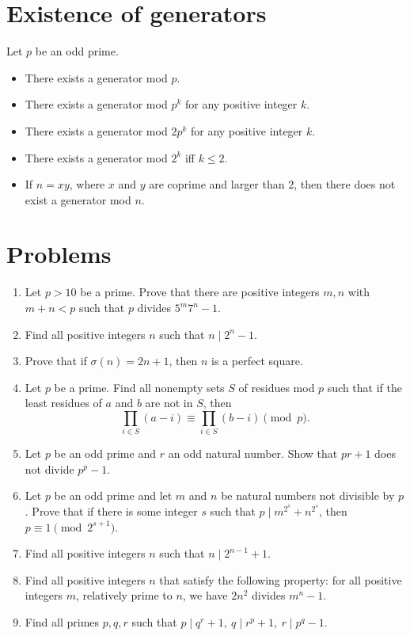 \documentclass{article}
\begin{document}
\section{Existence of generators}
Let $p$ be an odd prime.
\begin{itemize}
	\item There exists a generator mod $p$.
	\item There exists a generator mod $p^k$ for any positive integer $k$.
	\item There exists a generator mod $2p^k$ for any positive integer $k$.
	\item There exists a generator mod $2^k$ iff $k\le 2$.
	\item If $n=xy$, where $x$ and $y$ are coprime and larger than $2$, then there
	      does not exist a generator mod $n$.
\end{itemize}
\section{Problems}
\begin{enumerate}
	\item Let $p>10$ be a prime. Prove that there are positive integers $m,n$ with
	      $m+n<p$ such that $p$ divides $5^m7^n-1$.
	\item Find all positive integers $n$ such that $n\mid 2^n-1$.
	\item Prove that if $\sigma(n)=2n+1$, then $n$ is a perfect square.
	\item Let $p$ be a prime. Find all nonempty sets $S$ of residues mod $p$ such
	      that if the least residues of $a$ and $b$ are not in $S$, then \[\prod_{i\in S}(a-i)\equiv\prod_{i\in S}(b-i)\pmod
		      p.\]
	\item Let $p$ be an odd prime and $r$ an odd natural number. Show that $pr+1$
	      does not divide $p^p-1$.
	\item Let $p$ be an odd prime and let $m$ and $n$ be natural numbers not
	      divisible by $p$. Prove that if there is some integer $s$ such that $p\mid
		      m^{2^s}+n^{2^s}$, then $p\equiv 1\pmod{2^{s+1}}$.
	\item Find all positive integers $n$ such that $n\mid 2^{n-1}+1$.
	\item Find all positive integers $n$ that satisfy the following property:
	      for all positive integers $m$, relatively prime to $n$, we have
	      $2n^2$ divides $m^n-1$.
	\item Find all primes $p,q,r$ such that $p\mid q^r+1,\ q\mid r^p+1,\ r\mid
		      p^q-1$.
\end{enumerate}
\newpage
\end{document}
